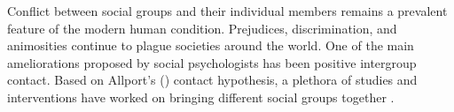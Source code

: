 \documentclass[man, 12pt, a4paper]{apa7}
\theoremstyle{break}
\theoremstyle{plain}
\begin{document}
%
%
%

Conflict between social groups and their individual members remains a prevalent feature of the modern human condition. Prejudices, discrimination, and animosities continue to plague societies around the world. One of the main ameliorations proposed by social psychologists has been positive intergroup contact. Based on Allport's (\citeyear{Allport1954b}) contact hypothesis, a plethora of studies and interventions have worked on bringing different social groups together \citep[e.g.,][]{AlRamiah2012a, Reimer2021}. 
\end{document}
